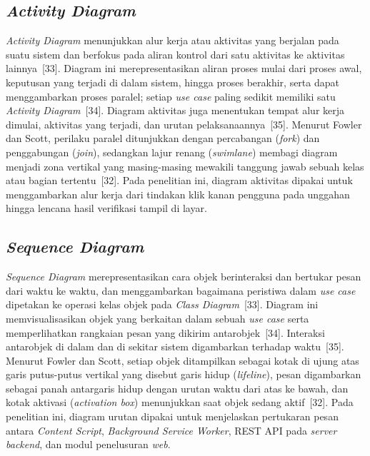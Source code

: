 \documentclass[12pt,a4paper,twoside]{report}
\begin{document}
\subsection{\textit{Activity Diagram}}

\textit{Activity Diagram} menunjukkan alur kerja atau aktivitas yang berjalan pada suatu sistem dan berfokus pada aliran kontrol dari satu aktivitas ke aktivitas lainnya~[33]. Diagram ini merepresentasikan aliran proses mulai dari proses awal, keputusan yang terjadi di dalam sistem, hingga proses berakhir, serta dapat menggambarkan proses paralel; setiap \textit{use case} paling sedikit memiliki satu \textit{Activity Diagram}~[34]. Diagram aktivitas juga menentukan tempat alur kerja dimulai, aktivitas yang terjadi, dan urutan pelaksanaannya~[35]. Menurut Fowler dan Scott, perilaku paralel ditunjukkan dengan percabangan (\textit{fork}) dan penggabungan (\textit{join}), sedangkan lajur renang (\textit{swimlane}) membagi diagram menjadi zona vertikal yang masing-masing mewakili tanggung jawab sebuah kelas atau bagian tertentu~[32]. Pada penelitian ini, diagram aktivitas dipakai untuk menggambarkan alur kerja dari tindakan klik kanan pengguna pada unggahan hingga lencana hasil verifikasi tampil di layar.

\subsection{\textit{Sequence Diagram}}

\textit{Sequence Diagram} merepresentasikan cara objek berinteraksi dan bertukar pesan dari waktu ke waktu, dan menggambarkan bagaimana peristiwa dalam \textit{use case} dipetakan ke operasi kelas objek pada \textit{Class Diagram}~[33]. Diagram ini memvisualisasikan objek yang berkaitan dalam sebuah \textit{use case} serta memperlihatkan rangkaian pesan yang dikirim antarobjek~[34]. Interaksi antarobjek di dalam dan di sekitar sistem digambarkan terhadap waktu~[35]. Menurut Fowler dan Scott, setiap objek ditampilkan sebagai kotak di ujung atas garis putus-putus vertikal yang disebut garis hidup (\textit{lifeline}), pesan digambarkan sebagai panah antargaris hidup dengan urutan waktu dari atas ke bawah, dan kotak aktivasi (\textit{activation box}) menunjukkan saat objek sedang aktif~[32]. Pada penelitian ini, diagram urutan dipakai untuk menjelaskan pertukaran pesan antara \textit{Content Script}, \textit{Background Service Worker}, REST API pada \textit{server} \textit{backend}, dan modul penelusuran \textit{web}.
\end{document}

